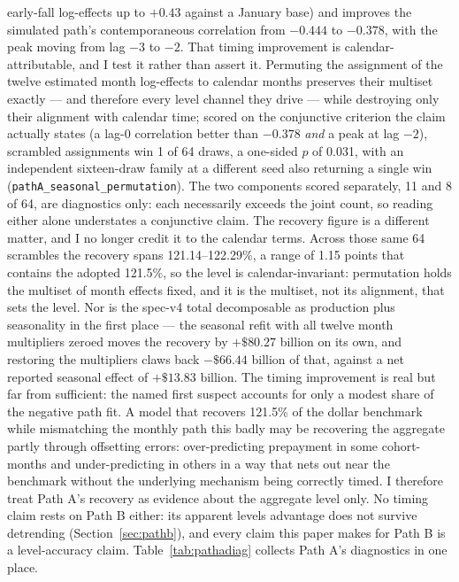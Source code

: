 \documentclass[12pt]{article}
\begin{document}
early-fall log-effects up to $+0.43$ against a January base) and improves the simulated path's contemporaneous correlation from $-0.444$ to $-0.378$, with the peak moving from lag $-3$ to $-2$. That timing improvement is calendar-attributable, and I test it rather than assert it. Permuting the assignment of the twelve estimated month log-effects to calendar months preserves their multiset exactly --- and therefore every level channel they drive --- while destroying only their alignment with calendar time; scored on the conjunctive criterion the claim actually states (a lag-0 correlation better than $-0.378$ \emph{and} a peak at lag $-2$), scrambled assignments win 1 of 64 draws, a one-sided $p$ of 0.031, with an independent sixteen-draw family at a different seed also returning a single win (\texttt{pathA\_seasonal\_permutation}). The two components scored separately, 11 and 8 of 64, are diagnostics only: each necessarily exceeds the joint count, so reading either alone understates a conjunctive claim. The recovery figure is a different matter, and I no longer credit it to the calendar terms. Across those same 64 scrambles the recovery spans 121.14--122.29\%, a range of 1.15 points that contains the adopted 121.5\%, so the level is calendar-invariant: permutation holds the multiset of month effects fixed, and it is the multiset, not its alignment, that sets the level. Nor is the spec-v4 total decomposable as production plus seasonality in the first place --- the seasonal refit with all twelve month multipliers zeroed moves the recovery by $+\$80.27$ billion on its own, and restoring the multipliers claws back $-\$66.44$ billion of that, against a net reported seasonal effect of $+\$13.83$ billion. The timing improvement is real but far from sufficient: the named first suspect accounts for only a modest share of the negative path fit. A model that recovers 121.5\% of the dollar benchmark while mismatching the monthly path this badly may be recovering the aggregate partly through offsetting errors: over-predicting prepayment in some cohort-months and under-predicting in others in a way that nets out near the benchmark without the underlying mechanism being correctly timed. I therefore treat Path A's recovery as evidence about the aggregate level only. No timing claim rests on Path B either: its apparent levels advantage does not survive detrending (Section~\ref{sec:pathb}), and every claim this paper makes for Path B is a level-accuracy claim. Table~\ref{tab:pathadiag} collects Path A's diagnostics in one place.
\end{document}
